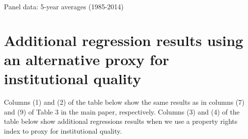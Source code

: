 \documentclass[abstract=on]{scrartcl}
\begin{document}
\begin{table}[H] \centering 
  \caption{Panel data: 5-year averages (1985-2014)} 
  \label{} 

\end{table} 

\newpage
\section{Additional regression results using an alternative proxy for institutional quality}

Columns (1) and (2) of the table below show the same results as in columns (7) and (9) of Table 3 in the main paper, respectively. Columns (3) and (4) of the table below show additional regressions results when we use a property rights index to proxy for institutional quality. 
\end{document}
